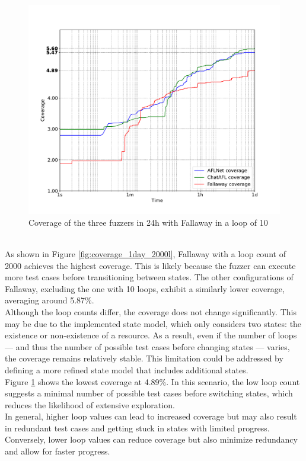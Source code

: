 \begin{figure}[H]
    \centering
    \includegraphics[width=1\textwidth]{Images/coverage_over_time_lighttpd-1day-10l.pdf}
    \caption{Coverage of the three fuzzers in 24h with Fallaway in a loop of 10}
    \label{fig:coverage_1day_10l}
\end{figure}
\phantom{}\\
As shown in Figure \ref{fig:coverage_1day_2000l}, Fallaway with a loop count of 2000 achieves the highest coverage. This is likely because the fuzzer can execute more test cases before transitioning between states. The other configurations of Fallaway, excluding the one with 10 loops, exhibit a similarly lower coverage, averaging around 5.87\%.
\\Although the loop counts differ, the coverage does not change significantly. This may be due to the implemented state model, which only considers two states: the existence or non-existence of a resource. As a result, even if the number of loops — and thus the number of possible test cases before changing states — varies, the coverage remains relatively stable. This limitation could be addressed by defining a more refined state model that includes additional states.
\\Figure \ref{fig:coverage_1day_10l} shows the lowest coverage at 4.89\%. In this scenario, the low loop count suggests a minimal number of possible test cases before switching states, which reduces the likelihood of extensive exploration.
\\In general, higher loop values can lead to increased coverage but may also result in redundant test cases and getting stuck in states with limited progress. Conversely, lower loop values can reduce coverage but also minimize redundancy and allow for faster progress.
